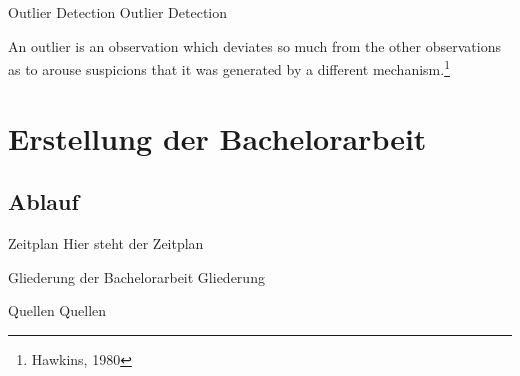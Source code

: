 \documentclass[t,8pt]{beamer}
\begin{document}
\begin{frame}{Outlier Detection}
Outlier Detection
\end{frame}

\begin{frame}{}
\glqq{}An outlier is an observation which deviates so much from the other   observations as to arouse suspicions that it was generated by a different  mechanism.\grqq{}\footnote{Hawkins, 1980}
\end{frame}

\section{Erstellung der Bachelorarbeit}
\subsection{Ablauf}

\begin{frame}{Zeitplan}
Hier steht der Zeitplan
\end{frame}

\begin{frame}{Gliederung der Bachelorarbeit}
Gliederung
\end{frame}

\begin{frame}{Quellen}
Quellen
\end{frame}
\end{document}
